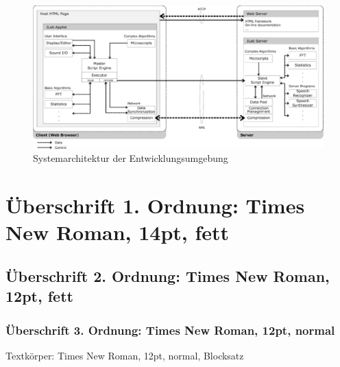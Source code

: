 \documentclass[12pt,a4paper]{article}
\begin{document}
\begin{figure}[hbt]
  \centering
  \includegraphics[scale=.45]{abbildung_1}
  \caption{Systemarchitektur der Entwicklungsumgebung}
  \label{fig:abbildung_1}
\end{figure}

\section{Überschrift 1. Ordnung: Times New Roman, 14pt, fett}

\subsection{Überschrift 2. Ordnung: Times New Roman, 12pt, fett}

\subsubsection{Überschrift 3. Ordnung: Times New Roman, 12pt, normal}

Textkörper: Times New Roman, 12pt, normal, Blocksatz

\nocite{2003_ESSV_MM}
\nocite{Fellbaum1999}



\end{document}
